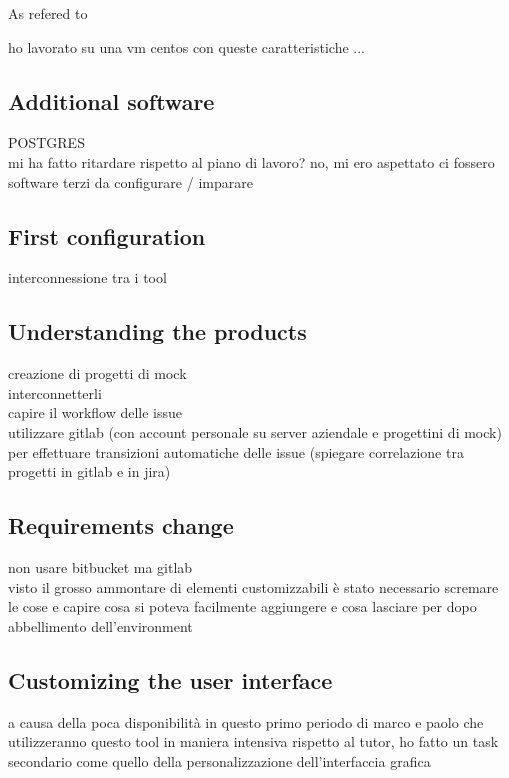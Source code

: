 		As refered to 
		
		ho lavorato su una vm centos con queste caratteristiche ...
		
	\subsection{Additional software}
		POSTGRES\\
		mi ha fatto ritardare rispetto al piano di lavoro? no, mi ero aspettato ci fossero software terzi da configurare / imparare
	
	\subsection{First configuration}
		interconnessione tra i tool
	
	\subsection{Understanding the products}
		creazione di progetti di mock\\
		interconnetterli\\
		capire il workflow delle issue\\
		utilizzare gitlab (con account personale su server aziendale e progettini di mock) per effettuare transizioni automatiche delle issue (spiegare correlazione tra progetti in gitlab e in jira)

	\subsection{Requirements change}
		non usare bitbucket ma gitlab\\
		visto il grosso ammontare di elementi customizzabili è stato necessario scremare le cose e capire cosa si poteva facilmente aggiungere e cosa lasciare per dopo\\
		abbellimento dell'environment
		

	\subsection{Customizing the user interface}
		a causa della poca disponibilità in questo primo periodo di marco e paolo che utilizzeranno questo tool in maniera intensiva rispetto al tutor, ho fatto un task secondario come quello della personalizzazione dell'interfaccia grafica
	
	
